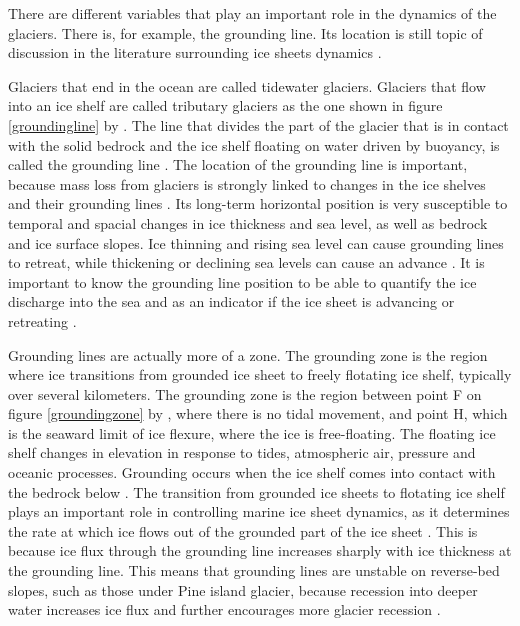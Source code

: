 \documentclass[a4paper,12pt]{article}
\begin{document}
There are different variables that play an important role in the dynamics of the glaciers. There is, for example, the grounding line. Its location is still topic of discussion in the literature surrounding ice sheets dynamics \cite[]{goldberg2018representing}.

Glaciers that end in the ocean are called tidewater glaciers. Glaciers that flow into an ice shelf are called tributary glaciers as the one shown in figure \ref{groundingline} by \cite{parizek2010implications}. The line that divides the part of the glacier that is in contact with the solid bedrock and the ice shelf floating on water driven by buoyancy, is called the grounding line \cite[]{cheng2019full}. The location of the grounding line is important, because mass loss from glaciers is strongly linked to changes in the ice shelves and their grounding lines \cite[]{brunt2010mapping,pritchard2012antarctic}. Its long-term horizontal position is very susceptible to temporal and spacial changes in ice thickness and sea level, as well as bedrock and ice surface slopes. Ice thinning and rising sea level can cause grounding lines to retreat, while thickening or declining sea levels can cause an advance \cite[]{friedl2020remote}. It is important to know the grounding line position to be able to quantify the ice discharge into the sea and as an indicator if the ice sheet is advancing or retreating \cite[]{konrad2018net}.

Grounding lines are actually more of a zone. The grounding zone is the region where ice transitions from grounded ice sheet to freely flotating ice shelf, typically over several kilometers. The grounding zone is the region between point F on figure \ref{groundingzone} by \cite{fricker2009mapping}, where there is no tidal movement, and point H, which is the seaward limit of ice flexure, where the ice is free-floating. The floating ice shelf changes in elevation in response to tides, atmospheric air, pressure and oceanic processes. Grounding occurs when the ice shelf comes into contact with the bedrock below \cite[]{fricker2009mapping}. The transition from grounded ice sheets to flotating ice shelf plays an important role in controlling marine ice sheet dynamics, as it determines the rate at which ice flows out of the grounded part of the ice sheet \cite[]{schoof2007ice}. This is because ice flux through the grounding line increases sharply with ice thickness at the grounding line. This means that grounding lines are unstable on reverse-bed slopes, such as those under Pine island glacier, because recession into deeper water increases ice flux and further encourages more glacier recession \cite[]{schoof2007marine}.
\end{document}
